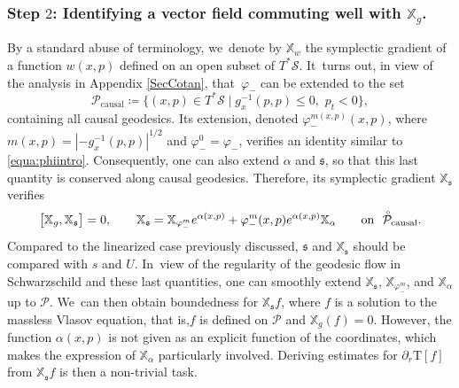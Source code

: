 \documentclass[JEP,XML,SOM,Unicode,published]{cedram}
\theoremstyle{plain}
\theoremstyle{definition}
\newcommand\T{{\mathbb{X}}}
\begin{document}
\subsubsection{Step $2$: Identifying a vector field commuting well with $\T_g$.}\label{Subsubsecstart} By a standard abuse of terminology, we~denote by $\T_w$ the symplectic gradient of a function $w(x,p)$ defined on an open subset of $T^* \mathcal{S}$. It~turns out, in view of the analysis in Appendix \ref{SecCotan}, that~$\varphi_-$ can be extended to the set
\[
\mathcal{P}_{\mathrm{causal}}\coloneqq \bigl\{ (x,p) \in T^* \mathcal{S} \mid g^{-1}_x(p,p) \leq 0, \, \,p_t <0 \bigr\},
\]
containing all causal geodesics. Its extension, denoted $\varphi_-^{m(x,p)}(x,p)$, where $m(x,p)=|-g_x^{-1}(p,p)|^{1/2}$ and $\varphi_-^0=\varphi_-$, verifies an identity similar to \eqref{equa:phiintro}. Consequently, one can also extend $\alpha$ and $\mathfrak{s}$, so that this last quantity is conserved along causal geodesics. Therefore, its symplectic gradient $\T_{\mathfrak{s}}$ verifies
\[
\bigl[ \T_g, \T_{\mathfrak{s}} \bigr]=0, \qquad \T_{\mathfrak{s}}=\T_{\varphi_-^m} e^{\alpha(x,p)}+ \varphi_-^m (x,p) e^{\alpha(x,p)} \T_\alpha \qquad \text{on\,\, $\accentset{\circ}{\mathcal{P}}_{\mathrm{causal}}$.}
\]
Compared to the linearized case previously discussed, $\mathfrak{s}$ and $\T_{\mathfrak{s}}$ should be compared with $s$ and $U$. In~view of the regularity of the geodesic flow in Schwarzschild and these last quantities, one can smoothly extend $\T_{\mathfrak{s}}$, $\T_{\varphi_-^m}$, and $\T_\alpha$ up to $\mathcal{P}$. We~can then obtain boundedness for $\T_{\mathfrak{s}} f$, where $f$ is a solution to the massless Vlasov equation, that is,$f$ is defined on $\mathcal{P}$ and $\T_g (f)=0$. However, the function $\alpha(x,p)$ is not given as an explicit function of the coordinates, which makes the expression of $\T_\alpha$ particularly involved. Deriving estimates for $\partial_r \mathrm{T}[f]$ from $\T_{\mathfrak{s}} f$ is then a non-trivial task.
\end{document}
